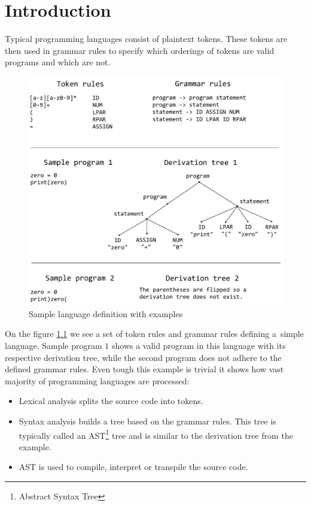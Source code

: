 \chapter{Introduction}

Typical programming languages consist of plaintext tokens. These tokens
are then used in grammar rules to specify which orderings of tokens are valid programs and
which are not.
\begin{figure}[!hbt]
	\includegraphics[width=\textwidth]{../img/tokens_and_grammar}
	\caption{Sample language definition with examples}
	\label{fig:chap1:tokens_and_grammar}
\end{figure}

On the figure \ref{fig:chap1:tokens_and_grammar} we see a set of token rules and grammar rules defining a~simple
language. Sample program $1$ shows a valid program in this language with its respective derivation tree, while
the second program does not adhere to the defined grammar rules.
Even tough this example is trivial it shows how vast majority of programming languages are processed:
\begin{itemize}
\item Lexical analysis splits the source code into tokens.
\item Syntax analysis builds a tree based on the grammar rules. This tree is typically called an AST\footnote{Abstract Syntax Tree} tree
and is similar to the derivation tree from the example.
\item AST is used to compile, interpret or transpile the source code.
\end{itemize}

